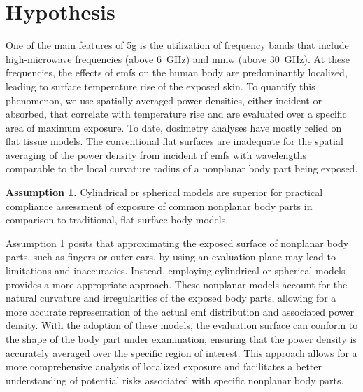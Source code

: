 \section{Hypothesis}
\label{sec:hypothesis}
One of the main features of \gls{5g} is the utilization of frequency bands that include high-microwave frequencies (above \SI{6}{\GHz}) and \gls{mmw} (above \SI{30}{\GHz}).
At these frequencies, the effects of \gls{emf}s on the human body are predominantly localized, leading to surface temperature rise of the exposed skin. 
To quantify this phenomenon, we use spatially averaged power densities, either incident or absorbed, that correlate with temperature rise and are evaluated over a specific area of maximum exposure.
To date, dosimetry analyses have mostly relied on flat tissue models.
The conventional flat surfaces are inadequate for the spatial averaging of the power density from incident \gls{rf} \gls{emf}s with wavelengths comparable to the local curvature radius of a nonplanar body part being exposed.
\begin{block}
    \textbf{Assumption 1.} Cylindrical or spherical models are superior for practical compliance assessment of exposure of common nonplanar body parts in comparison to traditional, flat-surface body models.
\end{block}
Assumption 1 posits that approximating the exposed surface of nonplanar body parts, such as fingers or outer ears, by using an evaluation plane may lead to limitations and inaccuracies.
Instead, employing cylindrical or spherical models provides a more appropriate approach.
These nonplanar models account for the natural curvature and irregularities of the exposed body parts, allowing for a more accurate representation of the actual \gls{emf} distribution and associated power density.
With the adoption of these models, the evaluation surface can conform to the shape of the body part under examination, ensuring that the power density is accurately averaged over the specific region of interest.
This approach allows for a more comprehensive analysis of localized exposure and facilitates a better understanding of potential risks associated with specific nonplanar body parts.

